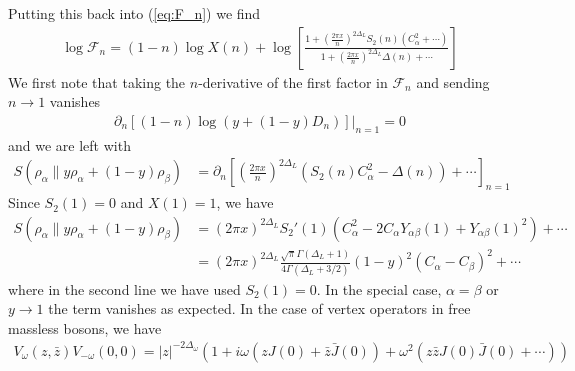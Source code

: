 \documentclass[11pt]{article}
\newcommand{\nn}{\nonumber}
\newcommand{\lb}{\left(}
\newcommand{\rb}{\right)}
\newcommand{\NL}[1]{\textcolor{blue}{#1}}
\begin{document}
  Putting this back into (\ref{eq:F_n}) we find
  \begin{align}
    \log\mathcal{F}_{n}=(1-n)\log X(n)+\log\left[\frac{1+\lb \frac{2\pi x}{n}\rb^{2\Delta_L}S_{2}(n)\lb C_{\alpha}^{2}+\cdots\rb}{1+\lb \frac{2\pi x}{n}\rb^{2\Delta_L}\Delta(n)+\cdots}\right]
  \end{align}
  We first note that taking the $n$-derivative of the first factor in $\mathcal{F}
  _{n}$ and sending $n\to 1$ vanishes
  \begin{align}
    \partial_{n}\left[(1-n)\log(y+(1-y)D_{n})\right]\Big|_{n=1}=0
  \end{align}
  and we are left with
  \begin{align}
    S(\rho_{\alpha}\|y\rho_{\alpha}+(1-y)\rho_{\beta}) & =\partial_{n}\left[\lb \frac{2\pi x}{n}\rb^{2\Delta_L}(S_{2}(n) C_{\alpha}^{2}-\Delta(n))+\cdots\right]_{n=1}
  \end{align}
  Since $S_{2}(1)=0$ and $X(1)=1$, we have
  \begin{align}
    S(\rho_{\alpha}\|y\rho_{\alpha}+(1-y)\rho_{\beta}) & = (2\pi x)^{2\Delta_L}S_{2}'(1)(C_{\alpha}^{2}-2C_{\alpha}Y_{\alpha\beta}(1)+Y_{\alpha\beta}(1)^{2})+\cdots\nn                \\
                                                       & =(2\pi x)^{2\Delta_L}\frac{\sqrt{\pi}\Gamma(\Delta_{L}+1)}{4\Gamma(\Delta_{L}+3/2)}(1-y)^{2}(C_{\alpha}-C_{\beta})^{2}+\cdots
  \end{align}
  where in the second line we have used $S_{2}(1)=0$. In the special case,
  $\alpha =\beta$ or $y\to 1$ the term vanishes as expected. In the case of vertex
  operators in free massless bosons, we have
  \begin{align}
    V_{\omega}(z,\bar{z})V_{-\omega}(0,0)=|z|^{-2\Delta_\omega}\lb 1+i\omega\lb z J(0)+\bar{z}\bar{J}(0)\rb+\omega^{2} (z\bar{z}J(0)\bar{J}(0)+\cdots)\rb
  \end{align}

\end{document}
